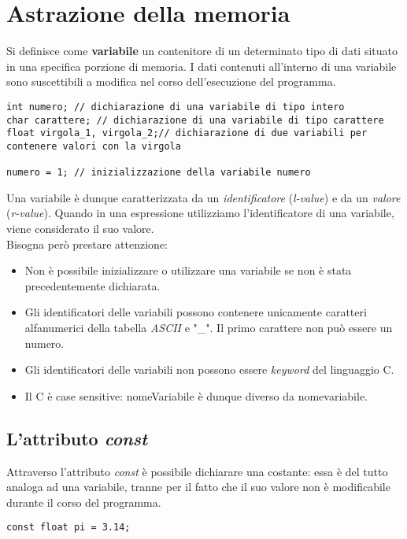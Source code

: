\section{Astrazione della memoria}
Si definisce come \textbf{variabile} un contenitore di un determinato tipo di dati situato in una specifica porzione di memoria. I dati contenuti all'interno di una variabile sono suscettibili a modifica nel corso dell'esecuzione del programma.
\begin{lstlisting}[title={Dichiarazione di variabili}]
int numero; // dichiarazione di una variabile di tipo intero
char carattere; // dichiarazione di una variabile di tipo carattere
float virgola_1, virgola_2;// dichiarazione di due variabili per contenere valori con la virgola

numero = 1; // inizializzazione della variabile numero
\end{lstlisting}
Una variabile è dunque caratterizzata da un \textit{identificatore} (\textit{l-value}) e da un \textit{valore} (\textit{r-value}). Quando in una espressione utilizziamo l'identificatore di una variabile, viene considerato il suo valore.\\
Bisogna però prestare attenzione:
\begin{itemize}[noitemsep]
	\item Non è possibile inizializzare o utilizzare una variabile se non è stata precedentemente dichiarata.
	\item Gli identificatori delle variabili possono contenere unicamente caratteri alfanumerici della tabella \textit{ASCII} e "\_". Il primo carattere non può essere un numero.
	\item Gli identificatori delle variabili non possono essere \textit{keyword} del linguaggio C.
	\item Il C è case sensitive: \colorbox{light-gray}{nomeVariabile} è dunque diverso da \colorbox{light-gray}{nomevariabile}.
\end{itemize}

\subsection{L'attributo \textit{const}}
Attraverso l'attributo \textit{const} è possibile dichiarare una costante: essa è del tutto analoga ad una variabile, tranne per il fatto che il suo valore non è modificabile durante il corso del programma.
\begin{lstlisting}[title={Dichiarazione di una costante}]
const float pi = 3.14;
\end{lstlisting}

